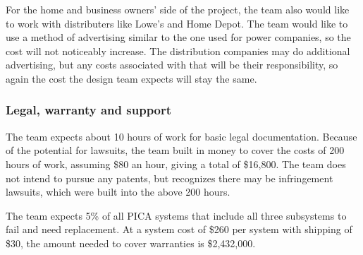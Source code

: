 For the home and business owners' side of the project, the team also would like to work with distributers like Lowe's and Home Depot. The team would like to use a method of advertising similar to the one used for power companies, so the cost will not noticeably increase. The distribution companies may do additional advertising, but any costs associated with that will be their responsibility, so again the cost the design team expects will stay the same.

\subsubsection{Legal, warranty and support}
The team  expects about 10 hours of work for basic legal documentation. Because of the potential for lawsuits, the team built in money to cover the costs of 200 hours of work, assuming \$80 an hour, giving a total of \$16,800. The team does not intend to pursue any patents, but recognizes there may be infringement lawsuits, which were built into the above 200 hours.

The team expects 5\% of all PICA systems that include all three subsystems to fail and need replacement. At a system cost of \$260 per system with shipping of \$30, the amount needed to cover warranties is \$2,432,000.

%
